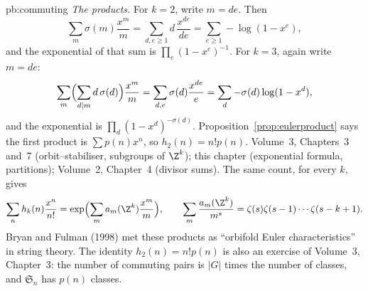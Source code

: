 \begin{solution}{pb:commuting}
\emph{The products.} For $k=2$, write $m=de$. Then
\[
\sum_m\sigma(m)\frac{x^m}m=\sum_{d,e\ge1}d\,\frac{x^{de}}{de}=\sum_{e\ge1}-\log(1-x^e),
\]
and the exponential of that sum is $\prod_e(1-x^e)^{-1}$. For $k=3$, again write $m=de$:
\[
\sum_m\Bigl(\sum_{d\mid m}d\,\sigma(d)\Bigr)\frac{x^m}m=\sum_{d,e}\sigma(d)\frac{x^{de}}e=\sum_d-\sigma(d)\log(1-x^d),
\]
and the exponential is $\prod_d(1-x^d)^{-\sigma(d)}$. Proposition~\ref{prop:eulerproduct} says the first product is $\sum p(n)x^n$, so $h_2(n)=n!p(n)$.
\tools Volume~3, Chapters~3 and~7 (orbit--stabiliser, subgroups of $\Z^k$); this chapter (exponential formula, partitions); Volume~2, Chapter~4 (divisor sums).
\leads The same count, for every $k$, gives
\[
\sum_nh_k(n)\frac{x^n}{n!}=\exp\Bigl(\sum_ma_m(\Z^k)\frac{x^m}m\Bigr),\qquad\sum_m\frac{a_m(\Z^k)}{m^s}=\zeta(s)\zeta(s-1)\cdots\zeta(s-k+1).
\] Bryan and Fulman (1998) met these products as ``orbifold Euler
characteristics'' in string theory. The identity $h_2(n)=n!p(n)$ is also an exercise of Volume~3, Chapter~3: the number of
commuting pairs is $|G|$ times the number of classes, and $\mathfrak S_n$ has $p(n)$ classes.
\end{solution}

